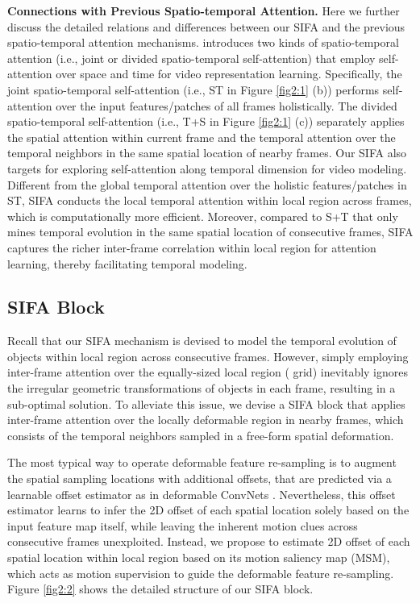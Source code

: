 \documentclass[10pt,twocolumn,letterpaper]{article}
\begin{document}
\textbf{Connections with Previous Spatio-temporal Attention.}
Here we further discuss the detailed relations and differences between our SIFA and the previous spatio-temporal attention mechanisms. \cite{Bertasius:ICML21} introduces two kinds of spatio-temporal attention (i.e., joint or divided spatio-temporal self-attention) that employ self-attention over space and time for video representation learning. Specifically, the joint spatio-temporal self-attention (i.e., ST in Figure \ref{fig2:1} (b)) performs self-attention over the input features/patches of all frames holistically. The divided spatio-temporal self-attention (i.e., T+S in Figure \ref{fig2:1} (c)) separately applies the spatial attention within current frame and the temporal attention over the temporal neighbors in the same spatial location of nearby frames. Our SIFA also targets for exploring self-attention along temporal dimension for video modeling. Different from the global temporal attention over the holistic features/patches in ST, SIFA conducts the local temporal attention within local region across frames, which is computationally more efficient. Moreover, compared to S+T that only mines temporal evolution in the same spatial location of consecutive frames, SIFA captures the richer inter-frame correlation within local region for attention learning, thereby facilitating temporal modeling.



\subsection{SIFA Block}
Recall that our SIFA mechanism is devised to model the temporal evolution of objects within local region across consecutive frames. However, simply employing inter-frame attention over the equally-sized local region ( grid) inevitably ignores the irregular geometric transformations of objects in each frame, resulting in a sub-optimal solution. To alleviate this issue, we devise a SIFA block that applies inter-frame attention over the locally deformable region in nearby frames, which consists of the temporal neighbors sampled in a free-form spatial deformation.

The most typical way to operate deformable feature re-sampling is to augment the spatial sampling locations with additional offsets, that are predicted via a learnable offset estimator as in deformable ConvNets \cite{Dai:ICCV17}. Nevertheless, this offset estimator learns to infer the 2D offset of each spatial location solely based on the input feature map itself, while leaving the inherent motion clues across consecutive frames unexploited. Instead, we propose to estimate 2D offset of each spatial location within local region based on its motion saliency map (MSM), which acts as motion supervision to guide the deformable feature re-sampling. Figure \ref{fig2:2} shows the detailed structure of our SIFA block.
\end{document}
